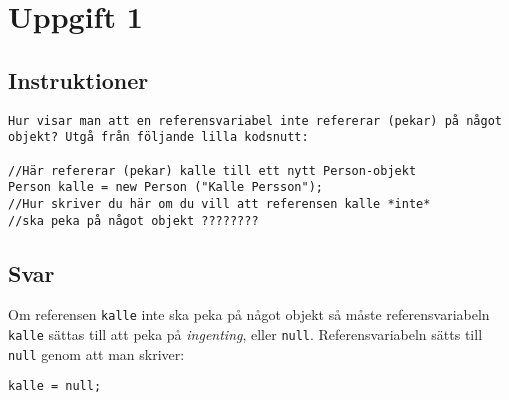 \section{Uppgift 1}\label{sec:uppg01}

\subsection{Instruktioner}
\begin{Verbatim}[fontsize=small]
Hur visar man att en referensvariabel inte refererar (pekar) på något
objekt? Utgå från följande lilla kodsnutt:

//Här refererar (pekar) kalle till ett nytt Person-objekt
Person kalle = new Person ("Kalle Persson");
//Hur skriver du här om du vill att referensen kalle *inte*
//ska peka på något objekt ????????
\end{Verbatim}


\subsection{Svar}
Om referensen \texttt{kalle} inte ska peka på något objekt så måste
referensvariabeln \texttt{kalle} sättas till att peka på \emph{ingenting},
eller \texttt{null}.  Referensvariabeln sätts till \texttt{null} genom att man
skriver:
\begin{verbatim}kalle = null;\end{verbatim}

